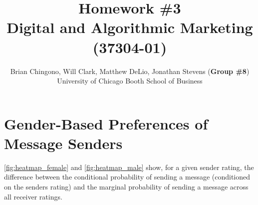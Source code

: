 



\title{Homework \#3\\
Digital and Algorithmic Marketing (37304-01)}
\author{
Brian Chingono, Will Clark, Matthew DeLio, Jonathan Stevens (\textbf{Group \#8})\\
University of Chicago Booth School of Business}

\maketitle

\section{Gender-Based Preferences of Message Senders}

\cref{fig:heatmap_female} and \cref{fig:heatmap_male} show, for a given sender rating, the difference between the conditional probability of sending a message (conditioned on the senders rating) and the marginal probability of sending a message across all receiver ratings.

